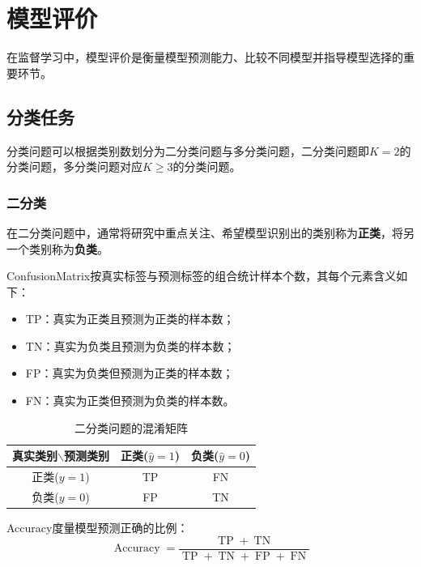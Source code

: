 \section{模型评价}

在监督学习中，模型评价是衡量模型预测能力、比较不同模型并指导模型选择的重要环节。

\subsection{分类任务}
分类问题可以根据类别数划分为二分类问题与多分类问题，二分类问题即$K=2$的分类问题，多分类问题对应$K\geqslant3$的分类问题。
\subsubsection{二分类}
在二分类问题中，通常将研究中重点关注、希望模型识别出的类别称为\textbf{正类}，将另一个类别称为\textbf{负类}。\par
\begin{definition}
	\gls{ConfusionMatrix}按真实标签与预测标签的组合统计样本个数，其每个元素含义如下：
	\begin{itemize}
		\item \gls{TP}：真实为正类且预测为正类的样本数；
		\item \gls{TN}：真实为负类且预测为负类的样本数；
		\item \gls{FP}：真实为负类但预测为正类的样本数；
		\item \gls{FN}：真实为正类但预测为负类的样本数。
	\end{itemize}
\end{definition}
\begin{table}[H]
	\centering
	\caption{二分类问题的混淆矩阵}
	\begin{tabular}{ccc}
		\toprule
		真实类别$\backslash$预测类别
		&正类($\hat{y}=1$)
		&负类($\hat{y}=0$) \\
		\midrule
		正类($y=1$)
		&TP
		&FN \\
		负类($y=0$)
		&FP
		&TN \\
		\bottomrule
	\end{tabular}
\end{table}
\begin{definition}
	\gls{Accuracy}度量模型预测正确的比例：
	\begin{equation*}
		\operatorname{Accuracy}=\frac{\operatorname{TP}+\operatorname{TN}}{\operatorname{TP}+\operatorname{TN}+\operatorname{FP}+\operatorname{FN}}
	\end{equation*}
\end{definition}
